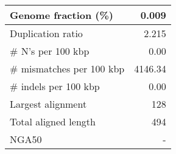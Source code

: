 \documentclass[12pt,a4paper]{article}
\begin{document}
\begin{table}[ht]
\begin{center}
\begin{tabular}{|l*{1}{|r}|}
Genome fraction (\%) & 0.009 \\ \hline
Duplication ratio & 2.215 \\ \hline
\# N's per 100 kbp & 0.00 \\ \hline
\# mismatches per 100 kbp & 4146.34 \\ \hline
\# indels per 100 kbp & 0.00 \\ \hline
Largest alignment & 128 \\ \hline
Total aligned length & 494 \\ \hline
NGA50 & - \\ \hline
\end{tabular}
\end{center}
\end{table}
\end{document}
